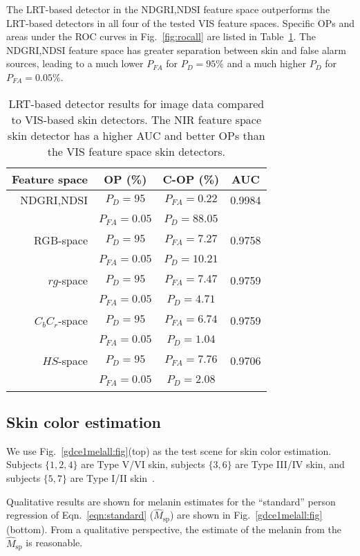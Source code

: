 \documentclass[10pt,journal,cspaper,compsoc]{IEEEtran}
\begin{document}
The LRT-based detector in the NDGRI,NDSI feature space outperforms the LRT-based detectors in all four of the tested VIS feature 
spaces. Specific OPs and areas under the ROC curves in Fig.~\ref{fig:rocall} are listed in Table~\ref{table:auc}. The NDGRI,NDSI 
feature space has greater separation between skin and false alarm sources, leading to a much lower $P_{FA}$ for $P_D=95\%$ and a 
much higher $P_D$ for $P_{FA}=0.05\%$.
\begin{table}[t]
\begin{center}
  \begin{tabular}{| r | c | c | c |}
    \hline
    Feature space & OP (\%) & C-OP (\%) & AUC \\ \hline\hline
    NDGRI,NDSI & $P_D=95$ & $P_{FA}=0.22$ & 0.9984  \\ 
    ~ & $P_{FA}=0.05$ & $P_D=88.05$  & \\ \hline
    RGB-space & $P_D=95$ & $P_{FA}=7.27$  & 0.9758 \\ 
    ~ & $P_{FA}=0.05$ & $P_D=10.21$  & \\ \hline
    $rg$-space & $P_D=95$ & $P_{FA}=7.47$ & 0.9759  \\ 
    ~ & $P_{FA}=0.05$ & $P_D=4.71$  & \\ \hline
    $C_bC_r$-space & $P_D=95$ & $P_{FA}=6.74$ & 0.9759  \\ 
    ~ & $P_{FA}=0.05$ & $P_D=1.04$  & \\ \hline
    $HS$-space &  $P_D=95$ & $P_{FA}=7.76$  & 0.9706 \\ 
    ~ & $P_{FA}=0.05$ & $P_D=2.08$  & \\ \hline
  \end{tabular}
\end{center}
\caption{LRT-based detector results for image data compared to VIS-based skin detectors. 
The NIR feature space skin detector has a higher AUC and better OPs than the VIS feature space skin detectors.}
\label{table:auc}
\end{table}

\subsection{Skin color estimation}
We use Fig.~\ref{gdce1melall:fig}(top) as the test scene for skin color estimation. Subjects $\{1,2,4\}$ 
are Type V/VI skin, subjects $\{3, 6\}$ are Type III/IV skin, and subjects $\{5,7\}$ are Type I/II 
skin~\cite{Matts1}.

Qualitative results are shown for melanin estimates for the ``standard'' person regression of Eqn.~\ref{eqn:standard} 
($\hat{M}_{\text{sp}}$) are shown in Fig.~\ref{gdce1melall:fig}(bottom).  From a qualitative perspective, 
the estimate of the melanin from the $\hat{M}_{\text{sp}}$ is reasonable.
\end{document}
